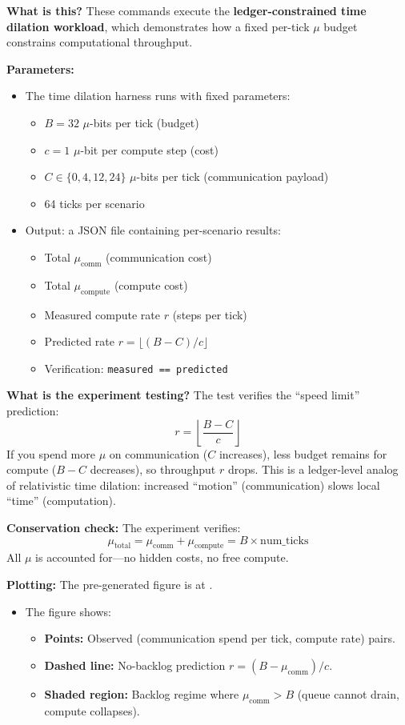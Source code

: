 \textbf{What is this?} These commands execute the \textbf{ledger-constrained time dilation workload}, which demonstrates how a fixed per-tick $\mu$ budget constrains computational throughput.

\textbf{Parameters:}
\begin{itemize}
    \item The time dilation harness runs with fixed parameters:
    \begin{itemize}
        \item $B = 32$ $\mu$-bits per tick (budget)
        \item $c = 1$ $\mu$-bit per compute step (cost)
        \item $C \in \{0, 4, 12, 24\}$ $\mu$-bits per tick (communication payload)
        \item 64 ticks per scenario
    \end{itemize}
    \item Output: a JSON file containing per-scenario results:
    \begin{itemize}
        \item Total $\mu_{\text{comm}}$ (communication cost)
        \item Total $\mu_{\text{compute}}$ (compute cost)
        \item Measured compute rate $r$ (steps per tick)
        \item Predicted rate $r = \lfloor (B - C) / c \rfloor$
        \item Verification: \texttt{measured == predicted}
    \end{itemize}
\end{itemize}

\textbf{What is the experiment testing?} The test verifies the ``speed limit'' prediction:
\[
r = \left\lfloor \frac{B - C}{c} \right\rfloor
\]
If you spend more $\mu$ on communication ($C$ increases), less budget remains for compute ($B - C$ decreases), so throughput $r$ drops. This is a ledger-level analog of relativistic time dilation: increased ``motion'' (communication) slows local ``time'' (computation).

\textbf{Conservation check:} The experiment verifies:
\[
\mu_{\text{total}} = \mu_{\text{comm}} + \mu_{\text{compute}} = B \times \text{num\_ticks}
\]
All $\mu$ is accounted for---no hidden costs, no free compute.

\textbf{Plotting:} The pre-generated figure is at .
\begin{itemize}
    \item The figure shows:
    \begin{itemize}
        \item \textbf{Points:} Observed (communication spend per tick, compute rate) pairs.
        \item \textbf{Dashed line:} No-backlog prediction $r = (B - \mu_{\text{comm}}) / c$.
        \item \textbf{Shaded region:} Backlog regime where $\mu_{\text{comm}} > B$ (queue cannot drain, compute collapses).
    \end{itemize}
\end{itemize}

